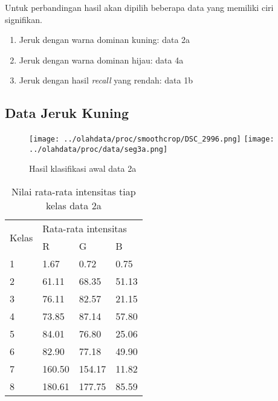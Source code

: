 \documentclass[laporan.tex]{subfiles}
\begin{document}
Untuk perbandingan hasil akan dipilih beberapa data yang memiliki ciri signifikan.

\begin{enumerate}
\item Jeruk dengan warna dominan kuning: data 2a
\item Jeruk dengan warna dominan hijau: data 4a
\item Jeruk dengan hasil \emph{recall} yang rendah: data 1b
\end{enumerate}

\subsection{Data Jeruk Kuning}

\begin{figure}[h!]
\centering
\texttt{[image: ../olahdata/proc/smoothcrop/DSC\_2996.png]}
\texttt{[image: ../olahdata/proc/data/seg3a.png]}
\caption{Hasil klasifikasi awal data 2a}
\end{figure}

\begin{table}[h!]
\centering
\begin{tabular}{|l|l|l|l|}
\cline{1-4}
\multirow{2}{*}{Kelas} & \multicolumn{3}{l|}{Rata-rata intensitas} \\
\cline{2-4}
 & R & G & B \\
\cline{1-4}
1 & 1.67 & 0.72 & 0.75 \\
2 & 61.11 & 68.35 & 51.13 \\
3 & 76.11 & 82.57 & 21.15 \\
4 & 73.85 & 87.14 & 57.80 \\
5 & 84.01 & 76.80 & 25.06 \\
6 & 82.90 & 77.18 & 49.90 \\
7 & 160.50 & 154.17 & 11.82 \\
8 & 180.61 & 177.75 & 85.59 \\
\cline{1-4}
\end{tabular}
\caption[]{Nilai rata-rata intensitas tiap kelas data 2a}
\label{table:avgyellow1}
\end{table}
\end{document}
